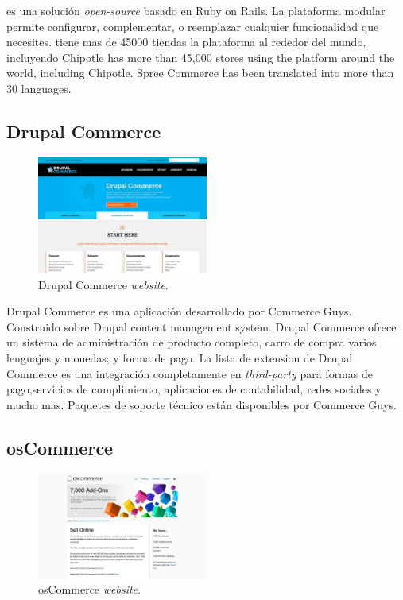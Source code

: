 \nameSpreeCommerce es una solución \ecommerce \textit{open-source}  basado en Ruby on Rails. La plataforma modular permite configurar, complementar, o reemplazar cualquier funcionalidad que necesites. \nameSpreeCommerce tiene mas de 45000 tiendas la plataforma al rededor del mundo, incluyendo Chipotle\cite{online_Chipotle} has more than 45,000 stores using the platform around the world, including Chipotle. Spree Commerce has been translated into more than 30 languages.

\newcommand{\nameDrupalCommerce}{Drupal Commerce }
\subsection{\nameDrupalCommerce}

\begin{figure}[h!]
	\centering
	\includegraphics[width=0.5\textwidth]{figuras/cap1/DrupalCommerceWebsite.jpg}
	\caption{\nameDrupalCommerce \textit{website}\cite{online_DrupalCommerce}.}
\end{figure}	

\nameDrupalCommerce es una aplicación \ecommerce desarrollado por Commerce Guys. Construido sobre Drupal content management system. \nameDrupalCommerce ofrece un sistema de administración de producto completo, carro de compra varios lenguajes y monedas; y forma de pago. La lista de extension de \nameDrupalCommerce es una integración completamente en\textit{ third-party} para formas de pago,servicios de cumplimiento, aplicaciones de contabilidad, redes sociales y mucho mas. Paquetes de soporte técnico están disponibles por Commerce Guys.

\newcommand{\nameOsCommerce}{osCommerce }
\subsection{\nameOsCommerce}

\begin{figure}[h!]
	\centering
	\includegraphics[width=0.5\textwidth]{figuras/cap1/osCommerceWebsite.jpg}
	\caption{\nameOsCommerce \textit{website}\cite{online_osCommerce}.}
\end{figure}

